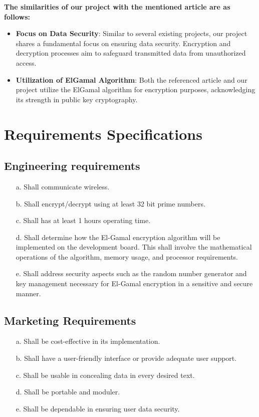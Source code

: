 \documentclass[12pt]{article}
\begin{document}
	 \textbf{The similarities of our project with the mentioned article are as follows:}
	 \begin{itemize}
	 	\item \textbf{Focus on Data Security}: Similar to several existing projects, our project shares a fundamental focus on ensuring data security. Encryption and decryption processes aim to safeguard transmitted data from unauthorized access.
	 	
	 	\item \textbf{Utilization of ElGamal Algorithm}: Both the referenced article and our project utilize the ElGamal algorithm for encryption purposes, acknowledging its strength in public key cryptography.
	 \end{itemize}
		

		
	
	
	\section{Requirements Specifications}
		
	\subsection{Engineering requirements}
	\begin{enumerate}
		\item[a.] Shall  communicate wireless.
		\item[b.] Shall encrypt/decrypt using at least 32 bit prime numbers.
		\item[c.] Shall has at least 1 hours operating time.
		\item[d.] Shall determine how the El-Gamal encryption algorithm will be implemented on the development board. This shall involve the mathematical operations of the algorithm, memory usage, and processor requirements. 
		\item[e.] Shall address security aspects such as the random number generator and key management necessary for El-Gamal encryption in a sensitive and secure manner.
		
	
				
	\end{enumerate}
	\subsection{Marketing Requirements}
	\begin{enumerate}
		\item[a.] Shall be cost-effective in its implementation.
		\item[b.] Shall have a user-friendly interface or provide adequate user support.
		\item[c.] Shall be usable in concealing data in every desired text.
		\item[d.] Shall be portable and moduler.
		\item[e.] Shall be dependable in ensuring user data security.				
	\end{enumerate}
\end{document}
